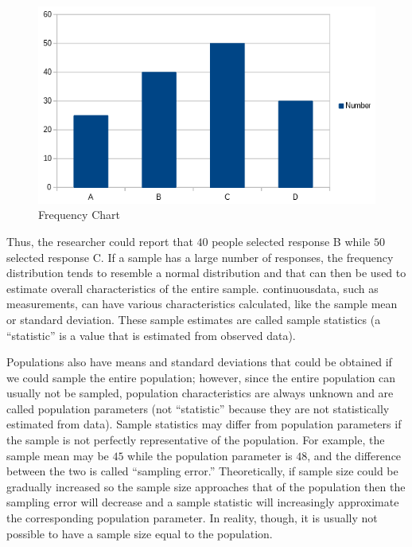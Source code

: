 \begin{figure}[H]
	\centering
	\includegraphics[width=\maxwidth{.95\linewidth}]{gfx/07-12}
	\caption{Frequency Chart}
	\label{07:fig12}
\end{figure}

Thus, the researcher could report that $ 40 $ people selected response B while $ 50 $ selected response C. If a sample has a large number of responses, the frequency distribution tends to resemble a normal distribution and that can then be used to estimate overall characteristics of the entire sample. \Gls{continuousdata}, such as measurements, can have various characteristics calculated, like the sample mean or standard deviation. These sample estimates are called sample statistics (a ``statistic'' is a value that is estimated from observed data). 

Populations also have means and standard deviations that could be obtained if we could sample the entire population; however, since the entire population can usually not be sampled, population characteristics are always unknown and are called population parameters (not ``statistic'' because they are not statistically estimated from data). Sample statistics may differ from population parameters if the sample is not perfectly representative of the population. For example, the sample mean may be $ 45 $ while the population parameter is $ 48 $, and the difference between the two is called ``sampling error.'' Theoretically, if sample size could be gradually increased so the sample size approaches that of the population then the sampling error will decrease and a sample statistic will increasingly approximate the corresponding population parameter. In reality, though, it is usually not possible to have a sample size equal to the population.

